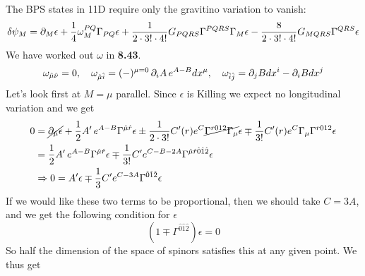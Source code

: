 \documentclass[11pt, class=article, crop=false]{standalone}
\begin{document}
\begin{enumerate}
	The BPS states in 11D require only the gravitino variation to vanish:
	\[
		\delta \psi_M = \partial_M \epsilon + \frac14 \omega_{M}^{PQ} \Gamma_{PQ} \epsilon + \frac{1}{2 \cdot 3! \cdot 4!} G_{PQRS} \Gamma^{PQRS}  \Gamma_M \epsilon - \frac{8}{2 \cdot 3! \cdot 4!} G_{MQRS} \Gamma^{QRS} \epsilon
	\]
	We have worked out $\omega$ in \textbf{8.43}.
	\[
		\omega_{\hat \mu \hat \nu} = 0,\quad \omega_{\hat \mu \hat i} = (-)^{\mu = 0}\, \partial_i A \, e^{A-B} dx^\mu, \quad \omega_{\hat i \hat j} = \partial_j B dx^i - \partial_i B dx^j
	\]
	Let's look first at $M = \mu$ parallel. Since $\epsilon$ is Killing we expect no longitudinal variation and we get
	\[
	\begin{aligned}
		0 &= \cancel{\partial_\mu \epsilon} + \frac12 A' \, e^{A - B} \Gamma^{\hat \mu \hat r} \epsilon \pm \frac{1}{2 \cdot 3!} C'(r) e^{C} \cancel{\Gamma^{r 0 12} \Gamma_\mu} \epsilon \mp \frac{1}{3!} C'(r) e^{C} \Gamma_\mu \Gamma^{r 0 1 2} \epsilon\\
		&= \frac12 A' \, e^{A - B} \Gamma^{\hat \mu \hat r} \epsilon \mp \frac{1}{3!} C' e^{C-B-2A} \Gamma^{\hat \mu \hat r \hat 0 \hat 1 \hat 2 } \epsilon \\
		& \Rightarrow 0 = A' \epsilon \mp \frac{1}{3} C' e^{C-3A} \Gamma^{\hat 0 \hat 1 \hat 2 } \epsilon\\
	\end{aligned}
	\] 
	If we would like these two terms to be proportional, then we should take $C= 3 A$, and we get the following condition for $\epsilon$
	\[
		(1 \mp \Gamma^{\hat 0 \hat 1 \hat 2}) \epsilon = 0
	\]
	So half the dimension of the space of spinors satisfies this at any given point. We thus get 
	

\end{enumerate}
\end{document}
